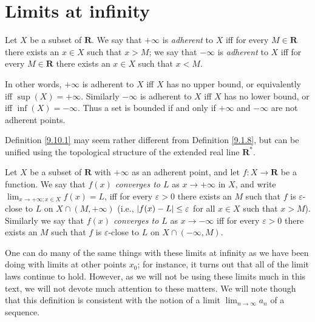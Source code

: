 \section{Limits at infinity}\label{sec 9.10}

\begin{definition}\label{9.10.1}
    Let \(X\) be a subset of \(\mathbf{R}\).
    We say that \(+\infty\) is \emph{adherent} to \(X\) iff for every \(M \in \mathbf{R}\) there exists an \(x \in X\) such that \(x > M\);
    we say that \(-\infty\) is \emph{adherent} to \(X\) iff for every \(M \in \mathbf{R}\) there exists an \(x \in X\) such that \(x < M\).
\end{definition}

\begin{note}
    In other words, \(+\infty\) is adherent to \(X\) iff \(X\) has no upper bound, or equivalently iff \(\sup(X) = +\infty\).
    Similarly \(-\infty\) is adherent to \(X\) iff \(X\) has no lower bound, or iff \(\inf(X) = -\infty\).
    Thus a set is bounded if and only if \(+\infty\) and \(-\infty\) are not adherent points.
\end{note}

\begin{remark}\label{9.10.2}
    Definition \ref{9.10.1} may seem rather different from Definition \ref{9.1.8}, but can be unified using the topological structure of the extended real line \(\mathbf{R}^*\).
\end{remark}

\begin{definition}\label{9.10.3}
    Let \(X\) be a subset of \(\mathbf{R}\) with \(+\infty\) as an adherent point, and let \(f : X \to \mathbf{R}\) be a function.
    We say that \emph{\(f(x)\) converges to \(L\)} as \(x \to +\infty\) in \(X\), and write \(\lim_{x \to +\infty ; x \in X} f(x) = L\), iff for every \(\varepsilon > 0\) there exists an \(M\) such that \(f\) is \(\varepsilon\)-close to \(L\) on \(X \cap (M, +\infty)\)
    (i.e., \(\abs*{f(x) - L} \leq \varepsilon\) for all \(x \in X\) such that \(x > M\)).
    Similarly we say that \emph{\(f(x)\) converges to \(L\)} as \(x \to -\infty\) iff for every \(\varepsilon > 0\) there exists an \(M\) such that \(f\) is \(\varepsilon\)-close to \(L\) on \(X \cap (-\infty, M)\).
\end{definition}

\begin{note}
    One can do many of the same things with these limits at infinity as we have been doing with limits at other points \(x_0\);
    for instance, it turns out that all of the limit laws continue to hold.
    However, as we will not be using these limits much in this text, we will not devote much attention to these matters.
    We will note though that this definition is consistent with the notion of a limit \(\lim_{n \to \infty} a_n\) of a sequence.
\end{note}

